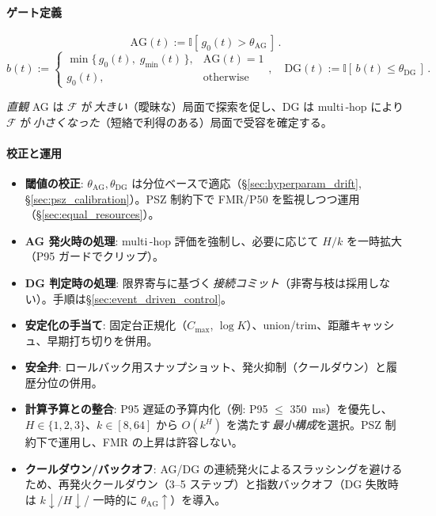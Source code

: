 \documentclass[ja=standard,xelatex]{bxjsarticle}
\newcommand{\F}{\mathcal{F}}
\begin{document}
\paragraph{ゲート定義}
\begin{equation}
  \mathrm{AG}(t) := \mathbb{I}[\, g_0(t) > \theta_{\mathrm{AG}}\,] \,.
  \label{eq:ag_trigger}
\end{equation}
\begin{equation}
  b(t) := \begin{cases}
    \min\{\, g_0(t),\; g_{\min}(t)\,\}, & \mathrm{AG}(t)=1\\
    g_0(t), & \mathrm{otherwise}
  \end{cases},\quad
  \mathrm{DG}(t) := \mathbb{I}[\, b(t) \le \theta_{\mathrm{DG}}\,] \,.
  \label{eq:dg_trigger}
\end{equation}

\noindent\textit{直観}\; AG は $\F$ が\,\emph{大きい}（曖昧な）局面で探索を促し、DG は multi\,\mbox{-}hop により $\F$ が\,\emph{小さくなった}（短絡で利得のある）局面で受容を確定する。

\paragraph{校正と運用}
\begin{itemize}[leftmargin=*]
  \item \textbf{閾値の校正}: $\theta_{\mathrm{AG}},\theta_{\mathrm{DG}}$ は分位ベースで適応（\S\ref{sec:hyperparam_drift}, \S\ref{sec:psz_calibration}）。PSZ 制約下で FMR/P50 を監視しつつ運用（\S\ref{sec:equal_resources}）。
  \item \textbf{AG 発火時の処理}: multi\,\mbox{-}hop 評価を強制し、必要に応じて $H/k$ を一時拡大（P95 ガードでクリップ）。
  \item \textbf{DG 判定時の処理}: 限界寄与に基づく\,\emph{接続コミット}（非寄与枝は採用しない）。手順は\S\ref{sec:event_driven_control}。
  \item \textbf{安定化の手当て}: 固定台正規化（$C_{\max}$, $\log K$）、union/trim、距離キャッシュ、早期打ち切りを併用。
  \item \textbf{安全弁}: ロールバック用スナップショット、発火抑制（クールダウン）と履歴分位の併用。
  \item \textbf{計算予算との整合}: P95 遅延の予算内化（例: P95 $\le$ \SI{350}{ms}）を優先し、$H\in\{1,2,3\}$、$k\in[8,64]$ から $O(k^H)$ を満たす\,\emph{最小構成}を選択。PSZ 制約下で運用し、FMR の上昇は許容しない。
  \item \textbf{クールダウン/バックオフ}: AG/DG の連続発火によるスラッシングを避けるため、再発火クールダウン（3--5 ステップ）と指数バックオフ（DG 失敗時は $k\downarrow/ H\downarrow$/ 一時的に $\theta_{\mathrm{AG}}\uparrow$）を導入。
\end{itemize}
\end{document}
